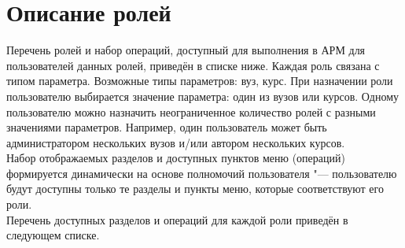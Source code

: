 \section{Описание ролей} \label{sec:role_description}
Перечень ролей и набор операций, доступный для выполнения в АРМ для пользователей данных ролей, приведён в списке ниже. Каждая роль связана с типом параметра. Возможные типы параметров: вуз, курс. При назначении роли пользователю выбирается значение параметра: один из вузов или курсов. Одному пользователю можно назначить неограниченное количество ролей с разными значениями параметров. Например, один пользователь может быть администратором нескольких вузов и/или автором нескольких курсов.\\

Набор отображаемых разделов и доступных пунктов меню (операций) формируется динамически на основе полномочий пользователя "--- пользователю будут доступны только те разделы и пункты меню, которые соответствуют его роли.\\

Перечень доступных разделов и операций для каждой роли приведён в следующем списке.


